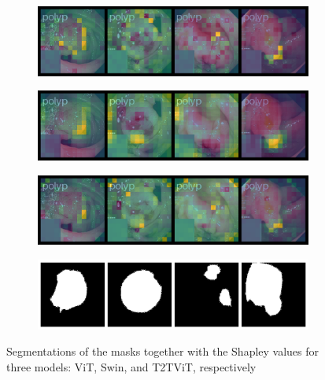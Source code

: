 \documentclass[magisterska,en]{pracamgr}
\begin{document}
\begin{figure}
\centering
\begin{subfigure}{0.55\textwidth}
   \includegraphics[width=1\linewidth]{./images/gastro_shap_for_segm_vit_2.png}
   \caption{}
   \label{fig:Ng2}
\end{subfigure}
\begin{subfigure}{0.55\textwidth}
   \includegraphics[width=1\linewidth]{./images/gastro_shap_for_segm_swin_2.png}
   \caption{}
   \label{fig:Ng2}
\end{subfigure}
\begin{subfigure}{0.55\textwidth}
   \includegraphics[width=1\linewidth]{./images/gastro_shap_for_segm_t2t_vit_2.png}
   \caption{}
   \label{fig:Ng2}
\end{subfigure}
\begin{subfigure}{0.55\textwidth}
   \includegraphics[width=1\linewidth]{./images/gastro_segmentation_2.png}
   \caption{}
   \label{fig:Ng1} 
\end{subfigure}
\caption{Segmentations of the masks together with the Shapley values for three models: ViT, Swin, and T2T\textunderscore ViT, respectively}
\label{segm_shap_2}
\end{figure}
\end{document}
